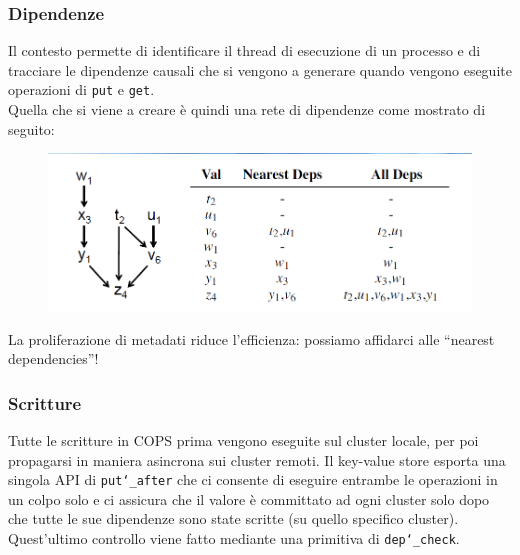 \begin{frame}
\frametitle{Dipendenze}
Il contesto permette di identificare il thread di esecuzione di un processo e
di tracciare le dipendenze causali che si vengono a generare quando vengono
eseguite operazioni di \texttt{put} e \texttt{get}. \\
Quella che si viene a creare è quindi una rete di dipendenze come mostrato di seguito:
\begin{figure}
	\centering
	\includegraphics[scale=0.35]{COPS/COPS4.png}
\end{figure}
La proliferazione di metadati riduce l'efficienza: possiamo affidarci
alle ``nearest dependencies''!
\end{frame}

\begin{frame}
\frametitle{Scritture}
Tutte le scritture in COPS prima vengono eseguite sul cluster locale, per poi propagarsi
in maniera asincrona sui cluster remoti. Il key-value store esporta una singola API
di \texttt{put\char`_after} che ci consente di eseguire entrambe le operazioni in un 
colpo solo e ci assicura che il valore è committato ad ogni cluster solo dopo che tutte
le sue dipendenze sono state scritte (su quello specifico cluster). Quest'ultimo controllo
viene fatto mediante una primitiva di \texttt{dep\char`_check}.
\end{frame}

